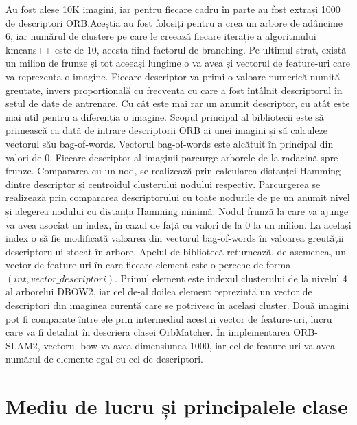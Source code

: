 \documentclass[12pt,a4paper]{report}
\begin{document}
Au fost alese 10K imagini, iar pentru fiecare cadru în parte au fost extrași 1000 de descriptori ORB.\@ Aceștia au 
fost folosiți pentru a crea un arbore de adâncime 6, iar numărul de clustere pe care le creează fiecare 
iterație a algoritmului kmeans++ este de 10, acesta fiind factorul de branching. Pe ultimul strat, există un milion 
de frunze și tot aceeași lungime o va avea și vectorul de feature-uri care va reprezenta o imagine. Fiecare
descriptor va primi o valoare numerică numită greutate, invers proporțională cu frecvența cu care a fost 
întâlnit descriptorul în setul de date de antrenare. Cu cât este mai rar un anumit descriptor, cu atât este
mai util pentru a diferenția o imagine. Scopul principal al bibliotecii este să primească ca dată
de intrare descriptorii ORB ai unei imagini și să calculeze vectorul său bag-of-words.
Vectorul bag-of-words este alcătuit în principal din valori de 0. Fiecare descriptor al 
imaginii parcurge arborele de la radacină spre frunze. Compararea cu un nod, se realizează 
prin calcularea distanței Hamming dintre descriptor și centroidul clusterului nodului respectiv.
Parcurgerea se realizează prin compararea descriptorului cu toate nodurile de pe un anumit nivel
și alegerea nodului cu distanța Hamming minimă. Nodul frunză la care va ajunge va avea asociat
un index, în cazul de față cu valori de la 0 la un milion. La același index o să fie modificată
valoarea din vectorul bag-of-words în valoarea greutății descriptorului stocat în arbore.
Apelul de bibliotecă returnează, de asemenea, un vector de feature-uri în care fiecare element
este o pereche de forma $ (int, vector\_descriptori) $. Primul element este indexul 
clusterului de la nivelul 4 al arborelui DBOW2, iar cel de-al doilea element reprezintă un 
vector de descriptori din imaginea curentă care se potrivesc în același cluster. Două imagini pot
fi comparate între ele prin intermediul acestui vector de feature-uri, lucru care va fi detaliat
în descriera clasei OrbMatcher. În implementarea ORB-SLAM2, vectorul bow va avea dimensiunea 1000,
iar cel de feature-uri va avea numărul de elemente egal cu cel de descriptori.

\section{Mediu de lucru și principalele clase}
\end{document}
